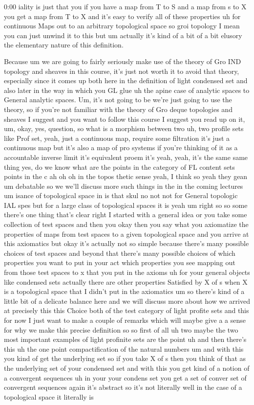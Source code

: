 \begin{unfinished}{0:00}
iality is just that you if you have a map from T to S and a map from s to X you get a map from T to X and it's easy to verify all of these properties uh for continuous Maps out to an arbitrary topological space so groi topology I mean you can just unwind it to this but um actually it's kind of a bit of a bit elusory the elementary nature of this definition.

Because um we are going to fairly seriously make use of the theory of Gro IND topology and sheaves in this course, it's just not worth it to avoid that theory, especially since it comes up both here in the definition of light condensed set and also later in the way in which you GL glue uh the apine case of analytic spaces to General analytic spaces. Um, it's not going to be we're just going to use the theory, so if you're not familiar with the theory of Gro deque topologies and sheaves I suggest and you want to follow this course I suggest you read up on it, um, okay, yes, question, so what is a morphism between two uh, two profile sets like Prof set, yeah, just a continuous map, require some filtration it's just a continuous map but it's also a map of pro systems if you're thinking of it as a accountable inverse limit it's equivalent proem it's yeah, yeah, it's the same same thing yes, do we know what are the points in the category of FL content sets points in the c ah oh oh in the topos thetic sense yeah, I think so yeah they gean um debatable so we we'll discuss more such things in the in the coming lectures um isance of topological space in is that skul no not not for General topologic IAL spes but for a large class of topological spaces it is yeah um right so so some there's one thing that's clear right I started with a general idea or you take some collection of test spaces and then you okay then you say what you axiomatize the properties of maps from test spaces to a given topological space and you arrive at this axiomatics but okay it's actually not so simple because there's many possible choices of test spaces and beyond that there's many possible choices of which properties you want to put in your act which properties you see mapping out from those test spaces to x that you put in the axioms uh for your general objects like condensed sets actually there are other properties Satisfied by X of s when X is a topological space that I didn't put in the axiomatics um so there's kind of a little bit of a delicate balance here and we will discuss more about how we arrived at precisely this this Choice both of the test category of light profite sets and this for now I just want to make a couple of remarks which will maybe give a a sense for why we make this precise definition so so first of all uh two maybe the two most important examples of light profinite sets are the point uh and then there's this uh the one point compactification of the natural numbers um and with this you kind of get the underlying set so if you take X of s then you think of that as the underlying set of your condensed set and with this you get kind of a notion of a convergent sequences uh in your your condens set you get a set of conver set of convergent sequences again it's abstract so it's not literally well in the case of a topological space it literally is 
\end{unfinished}
